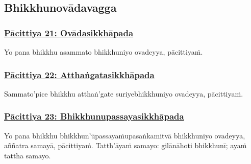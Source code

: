\subsection{Bhikkhunovādavagga}

\subsubsection*{\hyperref[exp]{Pācittiya 21: Ovādasikkhāpada}}
\label{pac21}

Yo pana bhikkhu asammato bhikkhuniyo ovadeyya, pācittiyaṁ.



\subsubsection*{\hyperref[exp22]{Pācittiya 22: Atthaṅgatasikkhāpada}}
\label{pac22}

Sammato'pi\makeatletter\hyperlink{endnote264-appendix}\makeatother \thinspace ce bhikkhu atthaṅ'gate suriye\makeatletter\hyperlink{endnote265-appendix}\makeatother \thinspace bhikkhuniyo ovadeyya, pācittiyaṁ.



\subsubsection*{\hyperref[exp23]{Pācittiya 23: Bhikkhunupassayasikkhāpada}}
\label{pac23}

Yo pana bhikkhu bhikkhun'ūpassayaṁ\makeatletter\hyperlink{endnote266-appendix}\makeatother \thinspace upasaṅkamitvā bhikkhuniyo ovadeyya, aññatra samayā, pācittiyaṁ. Tatth'āyaṁ samayo: gilānā\makeatletter\hyperlink{endnote267-appendix}\makeatother \thinspace hoti bhikkhunī; ayaṁ tattha samayo.



